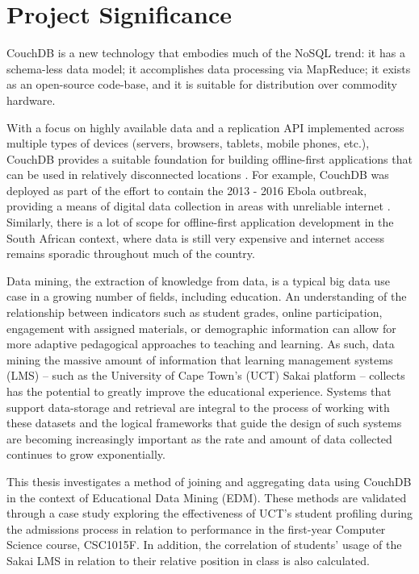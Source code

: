 \section{Project Significance}
CouchDB is a new technology that embodies much of the NoSQL trend: it has a schema-less data model; it accomplishes data processing via MapReduce; it exists as an open-source code-base, and it is suitable for distribution over commodity hardware.

With a focus on highly available data and a replication API implemented across multiple types of devices (servers, browsers, tablets, mobile phones, etc.), CouchDB provides a suitable foundation for building offline-first applications that can be used in relatively disconnected locations \cite{ebola2017}. For example, CouchDB was deployed as part of the effort to contain the 2013 - 2016 Ebola outbreak, providing a means of digital data collection in areas with unreliable internet \cite{ebola2017}. Similarly, there is a lot of scope for offline-first application development in the South African context, where data is still very expensive and internet access remains sporadic throughout much of the country.

Data mining, the extraction of knowledge from data, is a typical big data use case in a growing number of fields, including education. An understanding of the relationship between indicators such as student grades, online participation, engagement with assigned materials, or demographic information can allow for more adaptive pedagogical approaches to teaching and learning. As such, data mining the massive amount of information that learning management systems (LMS) – such as the University of Cape Town's (UCT) Sakai platform \cite{sakai} – collects has the potential to greatly improve the educational experience. Systems that support data-storage and retrieval are integral to the process of working with these datasets and the logical frameworks that guide the design of such systems are becoming increasingly important as the rate and amount of data collected continues to grow exponentially.

This thesis investigates a method of joining
and aggregating data using CouchDB in the context of Educational Data Mining (EDM). These methods are validated through a case study exploring the effectiveness of UCT's student profiling during the admissions process in relation to performance in the first-year Computer Science course, CSC1015F. In addition, the correlation of students' usage of the Sakai LMS in relation to their relative position in class is also calculated.

